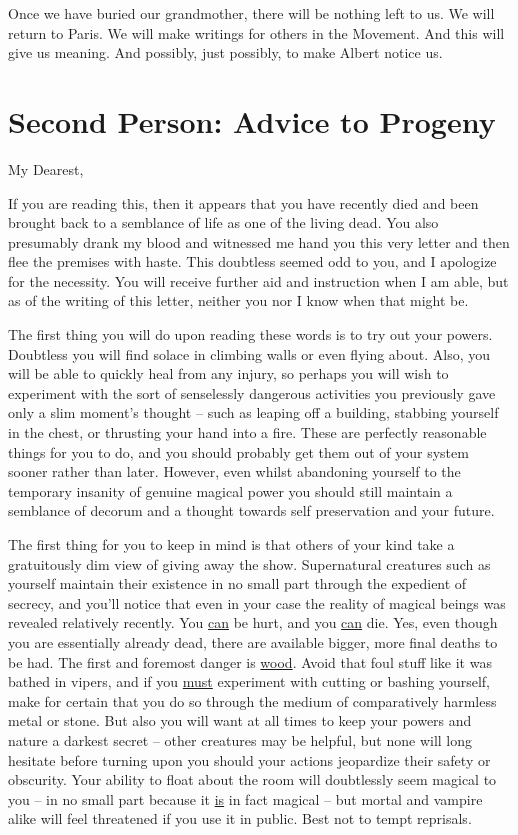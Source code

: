 Once we have buried our grandmother, there will be nothing left to us. We will return to Paris. We will make writings for others in the Movement. And this will give us meaning. And possibly, just possibly, to make Albert notice us.

\section[Second Person]{Second Person: Advice to Progeny}

{
{\Large My Dearest,}\medskip

If you are reading this, then it appears that you have recently died and been brought back to a semblance of life as one of the living dead. You also presumably drank my blood and witnessed me hand you this very letter and then flee the premises with haste. This doubtless seemed odd to you, and I apologize for the necessity. You will receive further aid and instruction when I am able, but as of the writing of this letter, neither you nor I know when that might be.

The first thing you will do upon reading these words is to try out your powers. Doubtless you will find solace in climbing walls or even flying about. Also, you will be able to quickly heal from any injury, so perhaps you will wish to experiment with the sort of senselessly dangerous activities you previously gave only a slim moment's thought -- such as leaping off a building, stabbing yourself in the chest, or thrusting your hand into a fire. These are perfectly reasonable things for you to do, and you should probably get them out of your system sooner rather than later. However, even whilst abandoning yourself to the temporary insanity of genuine magical power you should still maintain a semblance of decorum and a thought towards self preservation and your future.

The first thing for you to keep in mind is that others of your kind take a gratuitously dim view of giving away the show. Supernatural creatures such as yourself maintain their existence in no small part through the expedient of secrecy, and you'll notice that even in your case the reality of magical beings was revealed relatively recently. You \uline{can} be hurt, and you \uline{can} die. Yes, even though you are essentially already dead, there are available bigger, more final deaths to be had. The first and foremost danger is \uline{wood}. Avoid that foul stuff like it was bathed in vipers, and if you \uline{must} experiment with cutting or bashing yourself, make for certain that you do so through the medium of comparatively harmless metal or stone. But also you will want at all times to keep your powers and nature a darkest secret -- other creatures may be helpful, but none will long hesitate before turning upon you should your actions jeopardize their safety or obscurity. Your ability to float about the room will doubtlessly seem magical to you -- in no small part because it \uline{is} in fact magical -- but mortal and vampire alike will feel threatened if you use it in public. Best not to tempt reprisals.

}
